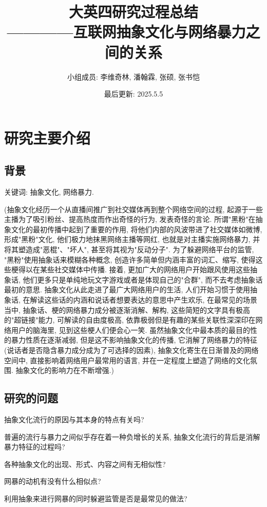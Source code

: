 \documentclass[12pt,a4paper]{ctexart}
\title{
    {\heiti\zihao{2} 大英四研究过程总结}\\
    {\songti\zihao{4} ————互联网抽象文化与网络暴力之间的关系}
}
\author{
    {\songti\zihao{4} 小组成员: 李维奇林, 潘翰霖, 张硕, 张书恺}\\
}
\date{最后更新: 2025.5.5}
\begin{document}
\maketitle
\tableofcontents
\newpage

\section{研究主要介绍}
\subsection{背景}

关键词: 抽象文化, 网络暴力.

(抽象文化经历一个从直播间推广到社交媒体再到整个网络空间的过程, 起源于一些主播为了吸引粉丝、提高热度而作出奇怪的行为, 发表奇怪的言论.
所谓"黑粉"在抽象文化的最初传播中起到了重要的作用, 将他们内部的风波带进了社交媒体如微博, 形成"黑粉"文化, 他们极力地抹黑网络主播等网红, 也就是对主播实施网络暴力, 并将其塑造成"恶棍"、"坏人", 甚至将其视为"反动分子".
为了躲避网络平台的监管, "黑粉"使用抽象话来模糊各种概念, 创造许多简单但内涵丰富的词汇、缩写, 使得这些梗得以在某些社交媒体中传播.
接着, 更加广大的网络用户开始跟风使用这些抽象话, 他们更多只是单纯地玩文字游戏或者是体现自己的"合群", 而不去考虑抽象话最初的意思.
抽象文化从此走进了最广大网络用户的生活, 人们开始习惯于使用抽象话, 在解读这些话的内涵和说话者想要表达的意思中产生欢乐, 在最常见的场景当中, 抽象话、梗的网络暴力成分被逐渐消解、解构, 这些简短的文字具有极高的"超链接"能力, 可解读的自由度极高, 依靠极弱但是有趣的某些关联性深深印在网络用户的脑海里, 见到这些梗人们便会心一笑.
虽然抽象文化中最本质的最目的性的暴力性质在逐渐减弱, 但是这不影响抽象文化的传播, 它消解了网络暴力的特征(说话者是否隐含暴力成分成为了可选择的因素), 抽象文化寄生在日渐普及的网络空间中, 直接影响着网络用户最常用的语言, 并在一定程度上塑造了网络的文化氛围.
抽象文化的影响力在不断增强.)

\subsection{研究的问题}

抽象文化流行的原因与其本身的特点有关吗?

普遍的流行与暴力之间似乎存在着一种负增长的关系, 抽象文化流行的背后是消解暴力特征的过程吗?

各种抽象文化的出现、形式、内容之间有无相似性?

网暴的动机有没有什么相似点?

利用抽象来进行网暴的同时躲避监管是否是最常见的做法?
\end{document}
